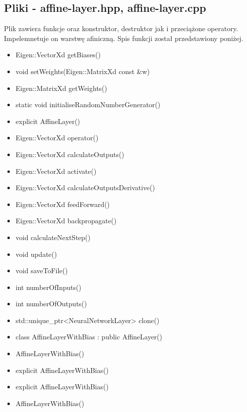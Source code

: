 \documentclass{classrep}
\begin{document}
{        \subsection{Pliki - affine-layer.hpp, affine-layer.cpp}
        {
            Plik zawiera funkcje oraz konstruktor, destruktor jak i przeciążone operatory.
            Impelemnetuje on warstwę afiniczną.
            Spis funkcji został przedstawiony poniżej.
            \begin{itemize}
                \item Eigen::VectorXd getBiases()
                \item void setWeights(Eigen::MatrixXd const \&w)
                \item Eigen::MatrixXd getWeights()
                \item static void initialiseRandomNumberGenerator()
                \item explicit AffineLayer()
                \item Eigen::VectorXd operator()
                \item Eigen::VectorXd calculateOutputs()
                \item Eigen::VectorXd activate()
                \item Eigen::VectorXd calculateOutputsDerivative()
                \item Eigen::VectorXd feedForward()
                \item Eigen::VectorXd backpropagate()
                \item void calculateNextStep()
                \item void update()
                \item void saveToFile()
                \item int numberOfInputs()
                \item int numberOfOutputs()
                \item std::unique\_ptr<NeuralNetworkLayer> clone()
                \item class AffineLayerWithBias : public AffineLayer()
                \item AffineLayerWithBias()
                \item explicit AffineLayerWithBias()
                \item explicit AffineLayerWithBias()
                \item AffineLayerWithBias()
            \end{itemize}
        }

}
\end{document}
